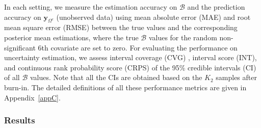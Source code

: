 \documentclass[12pt]{article}
\begin{document}
In each setting, we measure the estimation accuracy on $\boldsymbol{\mathcal{B}}$ and the prediction accuracy on $\boldsymbol{y}_{\Omega^{c}}$ (unobserved data) using mean absolute error (MAE) and root mean square error (RMSE) between the true values and the corresponding posterior mean estimations, where the true $\boldsymbol{\mathcal{B}}$ values for the random non-significant 6th covariate are set to zero. For evaluating the performance on uncertainty estimation, we assess interval coverage (CVG) \citep{heaton2019case}, interval score (INT), and continuous rank probability score (CRPS) \citep{gneiting2007strictly} of the 95\% credible intervals (CI) of all $\boldsymbol{\mathcal{B}}$ values. Note that all the CIs are obtained based on the $K_2$ samples after burn-in. The detailed definitions of all these performance metrics are given in Appendix~\ref{appC}.


 



\subsubsection{Results}


\end{document}
